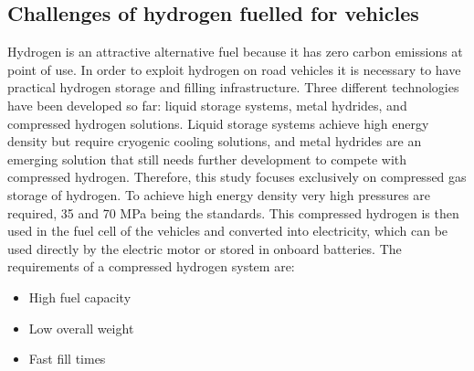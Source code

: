 



\subsection{Challenges of hydrogen fuelled for vehicles}

\label{sec:challenges}

Hydrogen is an attractive alternative fuel because it has zero carbon emissions at point of use. In order to exploit hydrogen on road vehicles it is necessary to have practical hydrogen storage and filling infrastructure. Three different technologies have been developed so far: liquid storage systems, metal hydrides, and compressed hydrogen solutions. Liquid storage systems achieve high energy density but require cryogenic cooling solutions, and metal hydrides are an emerging solution that still needs further development to compete with compressed hydrogen. Therefore, this study focuses exclusively on compressed gas storage of hydrogen. To achieve high energy density very high pressures are required, 35 and 70 MPa being the standards. This compressed hydrogen is then used in the fuel cell of the vehicles and converted into electricity, which can be used directly by the electric motor or stored in onboard batteries. The requirements of a compressed hydrogen system are: 


\begin{itemize}
\item High fuel capacity
\item Low overall weight
\item Fast fill times
\end{itemize}


